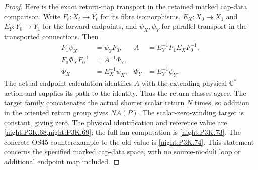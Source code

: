 \begin{proof}
Here is the exact return-map transport in the retained
marked cap-data comparison. Write \(F_t:X_t\to Y_t\) for its
fibre isomorphisms, \(E_X:X_0\to X_1\) and \(E_Y:Y_0\to Y_1\)
for the forward endpoints, and \(\psi_X,\psi_Y\) for parallel
transport in the transported connections. Then
\[
\begin{aligned}
 F_1\psi_X&=\psi_YF_0,
 & A&=E_Y^{-1}F_1E_XF_0^{-1},\\
 F_0\Phi_XF_0^{-1}&=A^{-1}\Phi_Y,\\
 \Phi_X&=E_X^{-1}\psi_X,
 & \Phi_Y&=E_Y^{-1}\psi_Y.
\end{aligned}
\]
The actual endpoint calculation identifies \(A\) with the
extending physical \(\mathbb C^*\) action and supplies its path
to the identity. Thus the return classes agree. The target
family concatenates the actual shorter scalar return \(N\)
times, so addition in the oriented return group gives
\(N A(P)\). The scalar-zero-winding target is constant,
giving zero.
The physical identification and reference value are
\cref{night:P3K.68,night:P3K.69}; the full fan computation is
\cref{night:P3K.73}. The concrete OS45 counterexample to the
old value is \cref{night:P3K.74}. This statement concerns the
specified marked cap-data space, with no source-moduli loop or
additional endpoint map included.
\end{proof}


